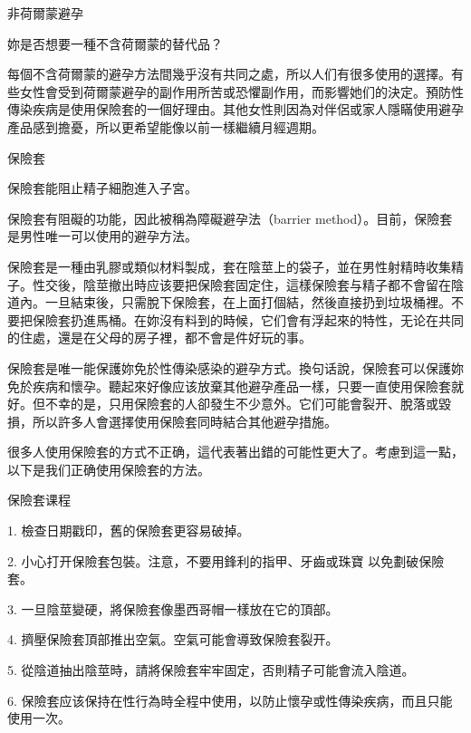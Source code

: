 \documentclass[12pt,UTF8]{ctexbook}
\begin{document}
非荷爾蒙避孕




妳是否想要一種不含荷爾蒙的替代品？

每個不含荷爾蒙的避孕方法間幾乎沒有共同之處，所以人们有很多使用的選擇。有些女性會受到荷爾蒙避孕的副作用所苦或恐懼副作用，而影響她们的決定。預防性傳染疾病是使用保險套的一個好理由。其他女性則因為对伴侶或家人隱瞞使用避孕產品感到擔憂，所以更希望能像以前一樣繼續月經週期。





保險套




保險套能阻止精子細胞進入子宮。

保險套有阻礙的功能，因此被稱為障礙避孕法（barrier method）。目前，保險套是男性唯一可以使用的避孕方法。

保險套是一種由乳膠或類似材料製成，套在陰莖上的袋子，並在男性射精時收集精子。性交後，陰莖撤出時应该要把保險套固定住，這樣保險套与精子都不會留在陰道內。一旦結束後，只需脫下保險套，在上面打個結，然後直接扔到垃圾桶裡。不要把保險套扔進馬桶。在妳沒有料到的時候，它们會有浮起來的特性，无论在共同的住處，還是在父母的房子裡，都不會是件好玩的事。

保險套是唯一能保護妳免於性傳染感染的避孕方式。換句话說，保險套可以保護妳免於疾病和懷孕。聽起來好像应该放棄其他避孕產品一樣，只要一直使用保險套就好。但不幸的是，只用保險套的人卻發生不少意外。它们可能會裂开、脫落或毀損，所以許多人會選擇使用保險套同時結合其他避孕措施。

很多人使用保險套的方式不正确，這代表著出錯的可能性更大了。考慮到這一點，以下是我们正确使用保險套的方法。





保險套课程




1. 檢查日期戳印，舊的保險套更容易破掉。

2. 小心打开保險套包裝。注意，不要用鋒利的指甲、牙齒或珠寶 以免劃破保險套。

3. 一旦陰莖變硬，將保險套像墨西哥帽一樣放在它的頂部。





4. 擠壓保險套頂部推出空氣。空氣可能會導致保險套裂开。

5. 從陰道抽出陰莖時，請將保險套牢牢固定，否則精子可能會流入陰道。

6. 保險套应该保持在性行為時全程中使用，以防止懷孕或性傳染疾病，而且只能使用一次。
\end{document}
